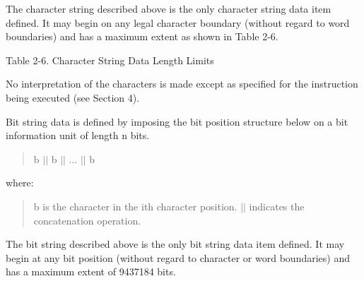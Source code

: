 The character string described above is the only character string data item
defined. It may begin on any legal character boundary (without regard to word
boundaries) and has a maximum extent as shown in Table 2-6.





Table 2-6. Character String Data Length Limits

No interpretation of the characters is made except as specified for the instruction being executed (see Section 4).


Bit string data is defined by imposing the bit position structure below on a
bit information unit of length n bits.
\begin{quotation}
b $||$ b $||$ ... $||$ b
\end{quotation}
where:
\begin{quotation}
b is the character in the ith character position.
$||$ indicates the concatenation operation.
\end{quotation}

The bit string described above is the only bit string data item defined. It may
begin at any bit position (without regard to character or word boundaries) and
has a maximum extent of 9437184 bits.  


